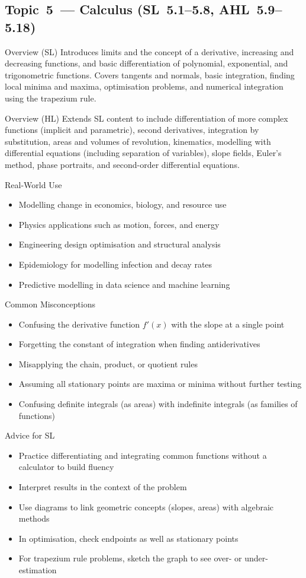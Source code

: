 \documentclass[11pt]{article}
\def\textbf#1{#1}%
\newcommand{\tocsubsection}[1]{\subsection{#1}}
\begin{document}
\tocsubsection{Topic 5 — Calculus (SL 5.1–5.8, AHL 5.9–5.18)}
\textbf{Overview (SL)}  
Introduces limits and the concept of a derivative, increasing and decreasing functions, and basic differentiation of polynomial, exponential, and trigonometric functions. Covers tangents and normals, basic integration, finding local minima and maxima, optimisation problems, and numerical integration using the trapezium rule.

\textbf{Overview (HL)}  
Extends SL content to include differentiation of more complex functions (implicit and parametric), second derivatives, integration by substitution, areas and volumes of revolution, kinematics, modelling with differential equations (including separation of variables), slope fields, Euler’s method, phase portraits, and second-order differential equations.

\textbf{Real-World Use}  
\begin{itemize}
  \item Modelling change in economics, biology, and resource use
  \item Physics applications such as motion, forces, and energy
  \item Engineering design optimisation and structural analysis
  \item Epidemiology for modelling infection and decay rates
  \item Predictive modelling in data science and machine learning
\end{itemize}

\textbf{Common Misconceptions}  
\begin{itemize}
  \item Confusing the derivative function $f'(x)$ with the slope at a single point
  \item Forgetting the constant of integration when finding antiderivatives
  \item Misapplying the chain, product, or quotient rules
  \item Assuming all stationary points are maxima or minima without further testing
  \item Confusing definite integrals (as areas) with indefinite integrals (as families of functions)
\end{itemize}

\textbf{Advice for SL}  
\begin{itemize}
  \item Practice differentiating and integrating common functions without a calculator to build fluency
  \item Interpret results in the context of the problem
  \item Use diagrams to link geometric concepts (slopes, areas) with algebraic methods
  \item In optimisation, check endpoints as well as stationary points
  \item For trapezium rule problems, sketch the graph to see over- or under-estimation
\end{itemize}
\end{document}
